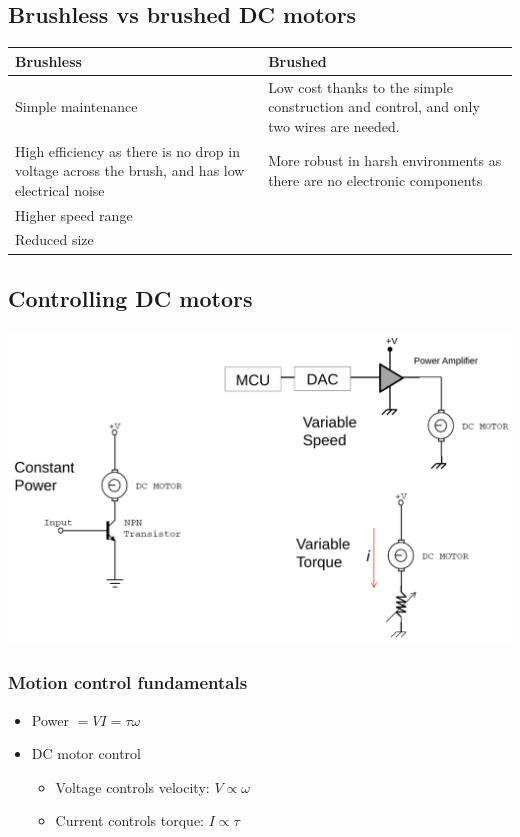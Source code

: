 \documentclass[11pt]{article}
\begin{document}
\subsection{Brushless vs brushed DC motors}
\label{sec:org995d7a4}
\begin{center}
\begin{tabular}{m{16em}|m{16em}}
Brushless & Brushed\\
\hline
Simple maintenance & Low cost thanks to the simple construction and control, and only two wires are needed.\\
\hline
High efficiency as there is no drop in voltage across the brush, and has low electrical noise & More robust in harsh environments as there are no electronic components\\
\hline
Higher speed range & \\
\hline
Reduced size & \\
\end{tabular}
\end{center}
\subsection{Controlling DC motors}
\label{sec:org2511169}
\begin{center}
\includegraphics[width=.9\linewidth]{./images/controlling-dc-motors.png}
\end{center}
\subsubsection{Motion control fundamentals}
\label{sec:org4cc2e0d}
\begin{itemize}
\item Power \(= VI = \tau \omega\)
\item DC motor control
\begin{itemize}
\item Voltage controls velocity: \(V \propto \omega\)
\item Current controls torque: \(I \propto \tau\)
\end{itemize}
\end{itemize}
\end{document}
